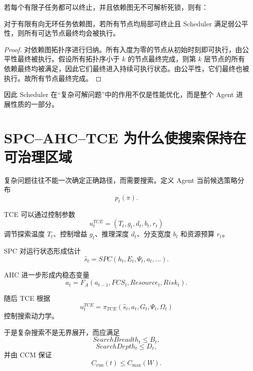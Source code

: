 若每个有限子任务都可以终止，并且依赖图无不可解析死锁，则有：

\begin{lemma}[公平调度进展引理]
对于有限有向无环任务依赖图，若所有节点均局部可终止且 Scheduler 满足弱公平性，则所有可达节点最终均会被执行。
\end{lemma}

\begin{proof}
对依赖图拓扑序进行归纳。所有入度为零的节点从初始时刻即可执行，由公平性最终被执行。假设所有拓扑序小于 $k$ 的节点最终完成，则第 $k$ 层节点的所有依赖最终均被满足，因此它们最终进入持续可执行状态。由公平性，它们最终也被执行。故所有节点最终完成。
\end{proof}

因此 Scheduler 在“复杂可解问题”中的作用不仅是性能优化，而是整个 Agent 进展性质的一部分。

\section{SPC--AHC--TCE 为什么使搜索保持在可治理区域}

复杂问题往往不能一次确定正确路径，而需要搜索。定义 Agent 当前候选策略分布
\begin{equation}
p_t(\pi).
\end{equation}

TCE 可以通过控制参数
\begin{equation}
u_t^{TCE}
=
(T_t,
g_t,
d_t,
b_t,
r_t)
\end{equation}
调节探索温度 $T_t$、控制增益 $g_t$、推理深度 $d_t$、分支宽度 $b_t$ 和资源预算 $r_t$。

SPC 对运行状态形成估计
\begin{equation}
\hat s_t
=
SPC(h_t,E_t,\Psi_t,a_t,\ldots).
\end{equation}

AHC 进一步形成内稳态变量
\begin{equation}
a_t
=
F_A(
a_{t-1},
FCS_t,
Resource_t,
Risk_t
).
\end{equation}

随后 TCE 根据
\begin{equation}
u_t^{TCE}
=
\pi_{TCE}
(
\hat s_t,
a_t,
G_t,
\Psi_t,
\Omega_t
)
\end{equation}
控制搜索动力学。

于是复杂搜索不是无界展开，而应满足
\begin{equation}
SearchBreadth_t
\leq
B_t,
\end{equation}
\begin{equation}
SearchDepth_t
\leq
D_t,
\end{equation}
并由 CCM 保证
\begin{equation}
C_{\mathrm{run}}(t)
\leq
C_{\max}(W).
\end{equation}

